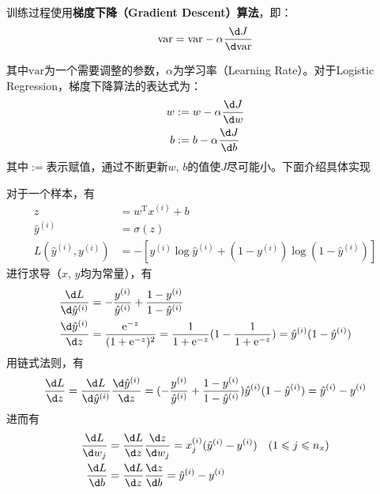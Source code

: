 训练过程使用\textbf{梯度下降（Gradient Descent）算法}，即：
\begin{equation}
    \mathrm{var} = \mathrm{var} - \alpha \frac{\d J}{\d \mathrm{var}} \label{eq:gradient}
\end{equation}

其中$\mathrm{var}$为一个需要调整的参数，$\alpha$为学习率（Learning Rate）。对于Logistic Regression，梯度下降算法的表达式为：
\begin{equation}
    \begin{aligned}
    w &:= w - \alpha \frac{\d J}{\d w} \\
    b &:= b - \alpha \frac{\d J}{\d b}
    \end{aligned} 
    \label{eq:gradient_logistic}
\end{equation}
其中$:=$表示赋值，通过不断更新$w$, $b$的值使$J$尽可能小。下面介绍具体实现

对于一个样本，有
\begin{equation}
    \begin{aligned}
    z &= w^\mathrm{T} x^{(i)} + b \\
    \hat{y}^{(i)} &= \sigma(z) \\
    L(\hat{y}^{(i)}, y^{(i)}) &= -\left[y^{(i)} \log \hat{y}^{(i)} + (1 - y^{(i)}) \log (1 - \hat{y}^{(i)})\right]
    \end{aligned} 
    \label{eq:gradient_logistic_sample}
\end{equation}
进行求导（$x$, $y$均为常量），有
\begin{equation}
    \begin{aligned}
    &\frac{\d L}{\d \hat{y}^{(i)}} = -\frac{y^{(i)}}{\hat{y}^{(i)}} + \frac{1 - y^{(i)}}{1 - \hat{y}^{(i)}} \\
    &\frac{\d \hat{y}^{(i)}}{\d z} = \frac{\mathrm{e}^{-z}}{(1 + \mathrm{e}^{-z})^2} = \frac{1}{1 + \mathrm{e}^{-z}}(1 - \frac{1}{1 + \mathrm{e}^{-z}}) = \hat{y}^{(i)}(1 - \hat{y}^{(i)})\\
    \end{aligned}
\end{equation}
用链式法则，有
\begin{equation}
    \frac{\d L}{\d z} = \frac{\d L}{\d \hat{y}^{(i)}} \frac{\d \hat{y}^{(i)}}{\d z} = (-\frac{y^{(i)}}{\hat{y}^{(i)}} + \frac{1 - y^{(i)}}{1 - \hat{y}^{(i)}})\hat{y}^{(i)}(1 - \hat{y}^{(i)}) = \hat{y}^{(i)} - y^{(i)}
\end{equation}
进而有
\begin{equation}
    \begin{aligned}
    \frac{\d L}{\d w_j} &= \frac{\d L}{\d z} \frac{\d z}{\d w_j} = x_j^{(i)} (\hat{y}^{(i)} - y^{(i)}) \quad (1 \leqslant j \leqslant n_x) \\
    \frac{\d L}{\d b} &= \frac{\d L}{\d z} \frac{\d z}{\d b} = \hat{y}^{(i)} - y^{(i)}
    \end{aligned}
\end{equation}

